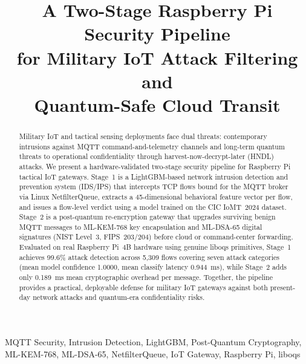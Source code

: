 \documentclass[conference]{IEEEtran}
\begin{document}
\title{A Two-Stage Raspberry Pi Security Pipeline\\for Military IoT Attack Filtering and\\Quantum-Safe Cloud Transit}

\author{
}

\maketitle

\begin{abstract}
Military IoT and tactical sensing deployments face dual threats: contemporary intrusions against MQTT command-and-telemetry channels and long-term quantum threats to operational confidentiality through harvest-now-decrypt-later (HNDL) attacks. We present a hardware-validated two-stage security pipeline for Raspberry Pi tactical IoT gateways. Stage~1 is a LightGBM-based network intrusion detection and prevention system (IDS/IPS) that intercepts TCP flows bound for the MQTT broker via Linux NetfilterQueue, extracts a 45-dimensional behavioral feature vector per flow, and issues a flow-level verdict using a model trained on the CIC IoMT~2024 dataset. Stage~2 is a post-quantum re-encryption gateway that upgrades surviving benign MQTT messages to ML-KEM-768 key encapsulation and ML-DSA-65 digital signatures (NIST Level~3, FIPS~203/204) before cloud or command-center forwarding. Evaluated on real Raspberry Pi~4B hardware using genuine liboqs primitives, Stage~1 achieves 99.6\% attack detection across 5,309 flows covering seven attack categories (mean model confidence 1.0000, mean classify latency 0.944~ms), while Stage~2 adds only 0.189~ms mean cryptographic overhead per message. Together, the pipeline provides a practical, deployable defense for military IoT gateways against both present-day network attacks and quantum-era confidentiality risks.
\end{abstract}

\begin{IEEEkeywords}
MQTT Security, Intrusion Detection, LightGBM, Post-Quantum Cryptography, ML-KEM-768, ML-DSA-65, NetfilterQueue, IoT Gateway, Raspberry Pi, liboqs
\end{IEEEkeywords}
\end{document}
